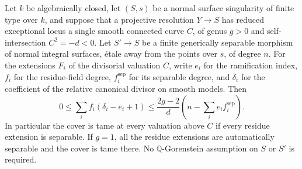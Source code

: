 \begin{proposition}
\label{D:single-curve-residue-tameness}
Let $k$ be algebraically closed, let $(S,s)$ be a normal surface
singularity of finite type over $k$, and suppose that a projective
resolution $Y\to S$ has reduced exceptional locus a single smooth
connected curve $C$, of genus $g>0$ and self-intersection $C^2=-d<0$.
Let $S'\to S$ be a finite generically separable morphism of normal
integral surfaces, \'etale away from the points over $s$, of degree $n$.
For the extensions $F_i$ of the divisorial valuation $C$, write
$e_i$ for the ramification index, $f_i$ for the residue-field degree,
$f_i^{\mathrm{sep}}$ for its separable degree, and $\delta_i$ for
the coefficient of the relative canonical divisor on smooth models.
Then
\[
 0\leq\sum_i f_i(\delta_i-e_i+1)
 \leq \frac{2g-2}{d}
             \left(n-\sum_i e_i f_i^{\mathrm{sep}}\right).
 \tag{D.PG.1}
\]
In particular the cover is tame at every valuation above $C$ if
every residue extension is separable. If $g=1$, all the residue
extensions are automatically separable and the cover is tame there.
No $\mathbb Q$-Gorenstein assumption on $S$ or $S'$ is required.
\end{proposition}

